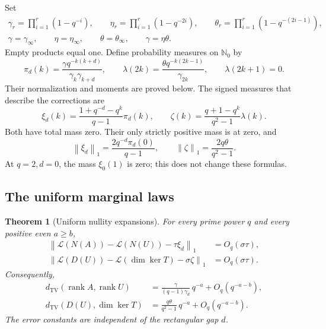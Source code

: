 \documentclass[11pt]{article}
\newtheorem{theorem}{Theorem}[section]
\theoremstyle{definition}
\theoremstyle{remark}
\newcommand{\N}{\mathbb N}
\newcommand{\Law}{\mathcal L}
\newcommand{\TV}{d_{\mathrm{TV}}}
\newcommand{\rank}{\operatorname{rank}}
\newcommand{\normone}[1]{\left\|#1\right\|_1}
\begin{document}
Set
\begin{gather*}
 \gamma_r=\prod_{i=1}^r(1-q^{-i}),\qquad
 \eta_r=\prod_{i=1}^r(1-q^{-2i}),\qquad
 \theta_r=\prod_{i=1}^r(1-q^{-(2i-1)}),\\
 \gamma=\gamma_\infty,\qquad \eta=\eta_\infty,\qquad
 \theta=\theta_\infty,
 \qquad \gamma=\eta\theta.
\end{gather*}
Empty products equal one. Define probability measures on $\N_0$ by
\begin{equation}\label{eq:limit-laws}
 \pi_d(k)=\frac{\gamma q^{-k(k+d)}}{\gamma_k\gamma_{k+d}},\qquad
 \lambda(2k)=\frac{\theta q^{-k(2k-1)}}{\gamma_{2k}},\qquad
 \lambda(2k+1)=0.
\end{equation}
Their normalization and moments are proved below. The signed measures that describe the corrections are
\begin{equation}\label{eq:signed-laws}
 \xi_d(k)=\frac{1+q^{-d}-q^k}{q-1}\pi_d(k),\qquad
 \zeta(k)=\frac{q+1-q^k}{q^2-1}\lambda(k).
\end{equation}
Both have total mass zero. Their only strictly positive mass is at zero, and
\begin{equation}\label{eq:signed-norms}
 \normone{\xi_d}=\frac{2q^{-d}\pi_d(0)}{q-1},\qquad
 \normone{\zeta}=\frac{2q\theta}{q^2-1}.
\end{equation}
At $q=2,d=0$, the mass $\xi_0(1)$ is zero; this does not change these formulas.

\subsection{The uniform marginal laws}

\begin{theorem}[Uniform nullity expansions]\label{thm:marginal}
For every prime power $q$ and every positive even $a\ge b$,
\begin{align}
 \normone{\Law(N(A))-\Law(N(U))-\tau\xi_d}
 &=O_q(\sigma\tau),\label{eq:rank-signed}\\
 \normone{\Law(D(U))-\Law(\dim\ker T)-\sigma\zeta}
 &=O_q(\sigma\tau).\label{eq:defect-signed}
\end{align}
Consequently,
\begin{align}
 \TV(\rank A,\rank U)
 &=\frac{\gamma}{(q-1)\gamma_d}\,q^{-a}
   +O_q(q^{-a-b}),\label{eq:rank-tv}\\
 \TV(D(U),\dim\ker T)
 &=\frac{q\theta}{q^2-1}\,q^{-a}
   +O_q(q^{-a-b}).\label{eq:defect-tv}
\end{align}
The error constants are independent of the rectangular gap $d$.
\end{theorem}
\end{document}
